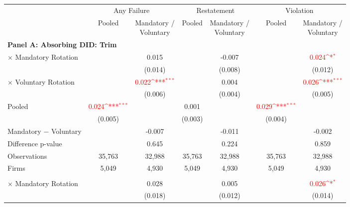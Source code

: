 \documentclass[10pt]{article}
\newcommand{\sym}[1]{\textsuperscript{#1}}
\begin{document}
\begin{minipage}{19cm}\fontsize{10}{12}\selectfont\setlength{\tabcolsep}{4pt}\renewcommand{\arraystretch}{1.12}


\def\sym#1{\ifmmode^{#1}\else\(^{#1}\)\fi}
\centering
{}
\label{tab:absorbing-transition-bad-historical-violation-upgrade-no-auditfirm-fe}
\begin{threeparttable}

\begin{tabular}{l cc cc cc}
\toprule
 & \multicolumn{2}{c}{Any Failure} & \multicolumn{2}{c}{Restatement} & \multicolumn{2}{c}{Violation} \\
\cmidrule(lr){2-3}\cmidrule(lr){4-5}\cmidrule(lr){6-7}
 & Pooled & \shortstack{Mandatory /\\Voluntary} & Pooled & \shortstack{Mandatory /\\Voluntary} & Pooled & \shortstack{Mandatory /\\Voluntary} \\
\midrule
\multicolumn{7}{l}{\textbf{Panel A: Absorbing DID: Trim}} \\
$\times$ Mandatory Rotation &  & 0.015 &  & -0.007 &  & \textcolor{red}{0.024\sym{*}} \\
 &  & (0.014) &  & (0.008) &  & (0.012) \\
$\times$ Voluntary Rotation &  & \textcolor{red}{0.022\sym{***}} &  & 0.004 &  & \textcolor{red}{0.026\sym{***}} \\
 &  & (0.006) &  & (0.004) &  & (0.005) \\
Pooled & \textcolor{red}{0.024\sym{***}} &  & 0.001 &  & \textcolor{red}{0.029\sym{***}} &  \\
 & (0.005) &  & (0.003) &  & (0.004) &  \\
Mandatory $-$ Voluntary &  & -0.007 &  & -0.011 &  & -0.002 \\
Difference p-value &  & 0.645 &  & 0.224 &  & 0.859 \\
Observations & 35,763 & 32,988 & 35,763 & 32,988 & 35,763 & 32,988 \\
Firms & 5,049 & 4,930 & 5,049 & 4,930 & 5,049 & 4,930 \\
\addlinespace
\multicolumn{7}{l}{\textbf{Panel B: Absorbing DID: Strict}} \\
$\times$ Mandatory Rotation &  & 0.028 &  & 0.005 &  & \textcolor{red}{0.026\sym{*}} \\
 &  & (0.018) &  & (0.012) &  & (0.014) \\

\end{tabular}
\end{threeparttable}
\end{minipage}
\end{document}
